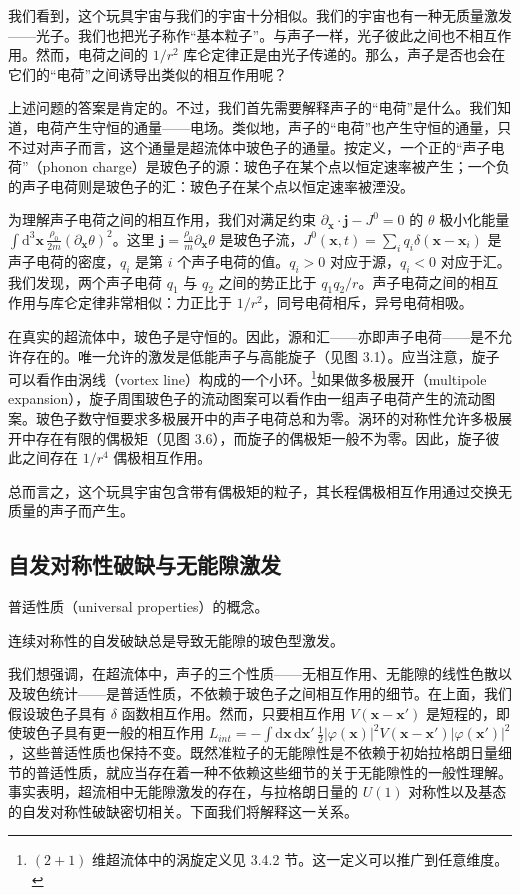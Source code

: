 我们看到，这个玩具宇宙与我们的宇宙十分相似。我们的宇宙也有一种无质量激发——光子。我们也把光子称作“基本粒子”。与声子一样，光子彼此之间也不相互作用。然而，电荷之间的 $1/r^2$ 库仑定律正是由光子传递的。那么，声子是否也会在它们的“电荷”之间诱导出类似的相互作用呢？

上述问题的答案是肯定的。不过，我们首先需要解释声子的“电荷”是什么。我们知道，电荷产生守恒的通量——电场。类似地，声子的“电荷”也产生守恒的通量，只不过对声子而言，这个通量是超流体中玻色子的通量。按定义，一个正的“声子电荷”（phonon charge）是玻色子的源：玻色子在某个点以恒定速率被产生；一个负的声子电荷则是玻色子的汇：玻色子在某个点以恒定速率被湮没。

为理解声子电荷之间的相互作用，我们对满足约束 $\partial_{\pmb{x}}\cdot\pmb{j} \allowbreak- J^0 = 0$ 的 $\theta$ 极小化能量 $\int \mathrm{d}^3\pmb{x}\,\allowbreak\frac{\rho_0}{2m}(\partial_{\pmb{x}}\theta)^2$。这里 $\pmb{j} = \frac{\rho_0}{m}\partial_{\pmb{x}}\theta$ 是玻色子流，$J^0(\pmb{x},t) = \sum_i q_i\delta(\pmb{x} - \pmb{x}_i)$ 是声子电荷的密度，$q_i$ 是第 $i$ 个声子电荷的值。$q_i > 0$ 对应于源，$q_i < 0$ 对应于汇。我们发现，两个声子电荷 $q_1$ 与 $q_2$ 之间的势正比于 $q_1q_2/r$。声子电荷之间的相互作用与库仑定律非常相似：力正比于 $1/r^2$，同号电荷相斥，异号电荷相吸。

在真实的超流体中，玻色子是守恒的。因此，源和汇——亦即声子电荷——是不允许存在的。唯一允许的激发是低能声子与高能旋子（见图 3.1）。应当注意，旋子可以看作由涡线（vortex line）构成的一个小环。\footnote{$(2+1)$ 维超流体中的涡旋定义见 3.4.2 节。这一定义可以推广到任意维度。}如果做多极展开（multipole expansion），旋子周围玻色子的流动图案可以看作由一组声子电荷产生的流动图案。玻色子数守恒要求多极展开中的声子电荷总和为零。涡环的对称性允许多极展开中存在有限的偶极矩（见图 3.6），而旋子的偶极矩一般不为零。因此，旋子彼此之间存在 $1/r^4$ 偶极相互作用。

总而言之，这个玩具宇宙包含带有偶极矩的粒子，其长程偶极相互作用通过交换无质量的声子而产生。

\subsection{自发对称性破缺与无能隙激发}

\begin{keypoints}
\item 普适性质（universal properties）的概念。
\item 连续对称性的自发破缺总是导致无能隙的玻色型激发。
\end{keypoints}

我们想强调，在超流体中，声子的三个性质——无相互作用、无能隙的线性色散以及玻色统计——是普适性质，不依赖于玻色子之间相互作用的细节。在上面，我们假设玻色子具有 $\delta$ 函数相互作用。然而，只要相互作用 $V(\pmb{x}-\pmb{x}')$ 是短程的，即使玻色子具有更一般的相互作用 $L_{int} = -\int \mathrm{d}\pmb{x}\,\mathrm{d}\pmb{x}'\,\frac{1}{2}|\varphi(\pmb{x})|^2 V(\pmb{x}-\pmb{x}')|\varphi(\pmb{x}')|^2$，这些普适性质也保持不变。既然准粒子的无能隙性是不依赖于初始拉格朗日量细节的普适性质，就应当存在着一种不依赖这些细节的关于无能隙性的一般性理解。事实表明，超流相中无能隙激发的存在，与拉格朗日量的 $U(1)$ 对称性以及基态的自发对称性破缺密切相关。下面我们将解释这一关系。

